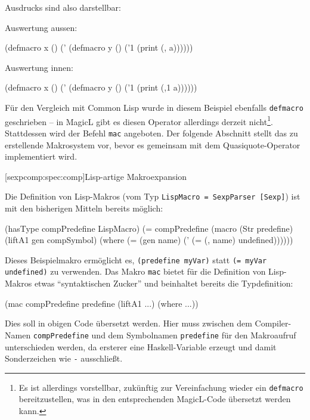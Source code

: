 \documentclass[12pt, a4paper, bibgerm]{scrbook}
\newenvironment{DIFnomarkup}{}{}
\newcommand\icode[1]{\lstinline?#1?}
\newcommand\lsubsection{}
\begin{document}
Ausdrucks sind also darstellbar:
\begin{DIFnomarkup}\begin{code}
Auswertung aussen:

(defmacro x ()
  (' (defmacro y ()
       ('1 (print (, a))))))


Auswertung innen:

(defmacro x ()
  (' (defmacro y ()
       ('1 (print (,1 a))))))
\end{code}\end{DIFnomarkup}
Für den Vergleich mit Common Lisp wurde in diesem Beispiel ebenfalls
\icode{defmacro} geschrieben -- in MagicL gibt es diesen Operator
allerdings derzeit nicht\footnote{Es ist allerdings vorstellbar,
  zukünftig zur Vereinfachung wieder ein \icode{defmacro}
  bereitzustellen, was in den entsprechenden MagicL-Code übersetzt
  werden kann.}. Stattdessen wird der Befehl \icode{mac} angeboten. Der
folgende Abschnitt stellt das zu erstellende Makrosystem vor, bevor es
gemeinsam mit dem Quasiquote-Operator implementiert wird.

\lsubsection[sexpcomp:spec:comp]{Lisp-artige Makroexpansion}

Die Definition von Lisp-Makros (vom Typ \icode{LispMacro = SexpParser [Sexp]}) ist mit
den bisherigen Mitteln bereits möglich:
\begin{DIFnomarkup}\begin{code}
(hasType compPredefine LispMacro)
(= compPredefine (macro (Str predefine)
                     (liftA1 gen compSymbol)
                   (where (= (gen name)
                             (' (= (, name) undefined))))))

\end{code}\end{DIFnomarkup}
Dieses Beispielmakro ermöglicht es, \icode{(predefine myVar)} statt
\icode{(= myVar undefined)} zu verwenden. Das Makro \icode{mac} bietet
für die Definition von Lisp-Makros etwas ``syntaktischen Zucker'' und
beinhaltet bereits die Typdefinition:
\begin{DIFnomarkup}\begin{code}
(mac compPredefine predefine
     (liftA1 ...)
   (where ...))
\end{code}\end{DIFnomarkup}
Dies soll in obigen Code übersetzt werden. Hier muss zwischen dem
Compiler-Namen \icode{compPredefine} und dem Symbolnamen
\icode{predefine} für den Makroaufruf unterschieden werden, da ersterer
eine Haskell-Variable erzeugt und damit Sonderzeichen wie \icode{-}
ausschließt.
\end{document}

